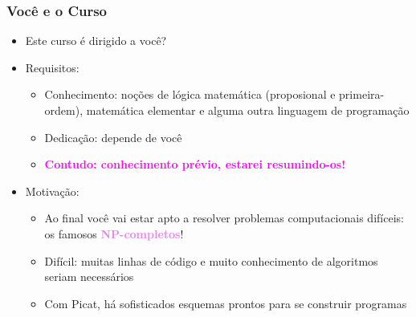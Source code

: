 \begin{frame}[fragile]
  \frametitle{Você e o Curso}
  \begin{itemize}

    \item Este curso é dirigido a você?
  \pause
    \item Requisitos:
   \pause
		\begin{itemize}
			\item Conhecimento: noções de lógica matemática 
			(proposional e primeira-ordem), matemática elementar
			e alguma outra linguagem de programação

			\item Dedicação: depende de você
			\pause
		\item \textcolor{magenta}{\textbf{Contudo: conhecimento prévio, estarei resumindo-os!}}
		\end{itemize}
		
  \pause
    \item Motivação:
   \pause
		\begin{itemize}
			\item Ao final você vai estar apto a resolver problemas
			computacionais difíceis: os famosos \textcolor{violet}{\textbf{NP-completos}}!
			
			\item Difícil: muitas linhas de código e muito 
			conhecimento de algoritmos seriam
			necessários
			
			\item Com Picat, há sofisticados esquemas prontos para se construir programas

		\end{itemize}

  \end{itemize}

\end{frame}


